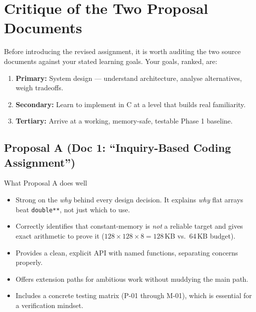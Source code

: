 \section{Critique of the Two Proposal Documents}

Before introducing the revised assignment, it is worth auditing the two source documents against your stated learning goals. Your goals, ranked, are:

\begin{enumerate}[label=\textbf{\arabic*.}]
  \item \textbf{Primary:} System design --- understand architecture, analyse alternatives, weigh tradeoffs.
  \item \textbf{Secondary:} Learn to implement in C at a level that builds real familiarity.
  \item \textbf{Tertiary:} Arrive at a working, memory-safe, testable Phase 1 baseline.
\end{enumerate}

\subsection{Proposal A (Doc 1: ``Inquiry-Based Coding Assignment'')}

\begin{goodbox}{What Proposal A does well}
\begin{itemize}
  \item Strong on the \emph{why} behind every design decision. It explains \emph{why} flat arrays beat \texttt{double**}, not just which to use.
  \item Correctly identifies that constant-memory is \emph{not} a reliable target and gives exact arithmetic to prove it ($128 \times 128 \times 8 = 128$\,KB vs.\ 64\,KB budget).
  \item Provides a clean, explicit API with named functions, separating concerns properly.
  \item Offers extension paths for ambitious work without muddying the main path.
  \item Includes a concrete testing matrix (P-01 through M-01), which is essential for a verification mindset.
\end{itemize}
\end{goodbox}

